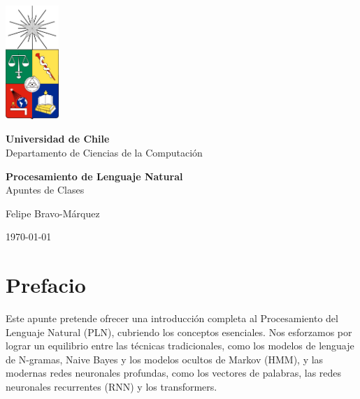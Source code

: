 \documentclass{book}
\begin{document}
\thispagestyle{empty}

\begin{titlepage}
    \begin{center}
        \vspace*{1cm}
        \includegraphics[width=2cm]{pics/escudocolor.png} %
        \vspace{1cm}
        
        {\Huge\textbf{Universidad de Chile}} \\
        \vspace{0.5cm}
        {\Large Departamento de Ciencias de la Computación} \\
        \vspace{2cm}
        
        {\Huge\textbf{Procesamiento de Lenguaje Natural}} \\
        \vspace{0.5cm}
        {\Large Apuntes de Clases} \\
        \vspace{2cm}
        
        {\Large Felipe Bravo-Márquez} \\
        \vspace{2cm}
        
        {\large \today}
    \end{center}
\end{titlepage}

\newpage

\thispagestyle{empty}

\newpage
{}

\tableofcontents 
\newpage

\listoftables
\newpage
\listoffigures
\newpage


\thispagestyle{empty}




\chapter*{Prefacio}
Este apunte pretende ofrecer una introducción completa al Procesamiento del Lenguaje Natural (PLN), cubriendo los conceptos esenciales. Nos esforzamos por lograr un equilibrio entre las técnicas tradicionales, como los modelos de lenguaje de N-gramas, Naive Bayes y los modelos ocultos de Markov (HMM), y las modernas redes neuronales profundas, como los vectores de palabras, las redes neuronales recurrentes (RNN) y los transformers.
\end{document}
